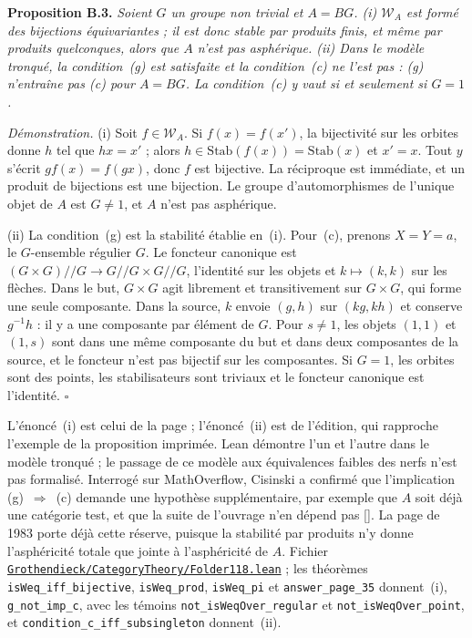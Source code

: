 \documentclass[11pt]{amsart}
\newcommand{\leanfile}[1]{\href{https://github.com/Commutator-IO/GrothendieckArchivesProofs/blob/main/Grothendieck/#1.lean}{\nolinkurl{Grothendieck/#1.lean}}}
\newcommand{\leanfile}[1]{\nolinkurl{Grothendieck/#1.lean}}
\newcommand{\moanswer}{\citealp{cisinski2026mo}}
\begin{document}
\medskip\noindent\textbf{Proposition B.3.} \emph{Soient $G$ un groupe non trivial et $A = BG$. (i) $\mathcal W_A$ est formé des bijections équivariantes ; il est donc stable par produits finis, et même par produits quelconques, alors que $A$ n'est pas asphérique. (ii) Dans le modèle tronqué, la condition~(g) est satisfaite et la condition~(c) ne l'est pas : (g) n'entraîne pas (c) pour $A = BG$. La condition~(c) y vaut si et seulement si $G = 1$.}

\medskip\noindent\emph{Démonstration.} (i) Soit $f \in \mathcal W_A$. Si $f(x) = f(x')$, la bijectivité sur les orbites donne $h$ tel que $hx = x'$ ; alors $h \in \mathrm{Stab}(f(x)) = \mathrm{Stab}(x)$ et $x' = x$. Tout $y$ s'écrit $g f(x) = f(gx)$, donc $f$ est bijective. La réciproque est immédiate, et un produit de bijections est une bijection. Le groupe d'automorphismes de l'unique objet de $A$ est $G \neq 1$, et $A$ n'est pas asphérique.

(ii) La condition~(g) est la stabilité établie en~(i). Pour~(c), prenons $X = Y = a$, le $G$-ensemble régulier $G$. Le foncteur canonique est $(G \times G)/\!/G \to G/\!/G \times G/\!/G$, l'identité sur les objets et $k \mapsto (k, k)$ sur les flèches. Dans le but, $G \times G$ agit librement et transitivement sur $G \times G$, qui forme une seule composante. Dans la source, $k$ envoie $(g, h)$ sur $(kg, kh)$ et conserve $g^{-1}h$ : il y a une composante par élément de $G$. Pour $s \neq 1$, les objets $(1, 1)$ et $(1, s)$ sont dans une même composante du but et dans deux composantes de la source, et le foncteur n'est pas bijectif sur les composantes. Si $G = 1$, les orbites sont des points, les stabilisateurs sont triviaux et le foncteur canonique est l'identité. $\square$

\medskip L'énoncé~(i) est celui de la page ; l'énoncé~(ii) est de l'édition, qui rapproche l'exemple de la proposition imprimée. Lean démontre l'un et l'autre dans le modèle tronqué ; le passage de ce modèle aux équivalences faibles des nerfs n'est pas formalisé. Interrogé sur MathOverflow, Cisinski a confirmé que l'implication (g)~$\Rightarrow$~(c) demande une hypothèse supplémentaire, par exemple que $A$ soit déjà une catégorie test, et que la suite de l'ouvrage n'en dépend pas [\moanswer]. La page de 1983 porte déjà cette réserve, puisque la stabilité par produits n'y donne l'asphéricité totale que jointe à l'asphéricité de $A$. Fichier \leanfile{CategoryTheory/Folder118} ; les théorèmes \texttt{isWeq\_iff\_bijective}, \texttt{isWeq\_prod}, \texttt{isWeq\_pi} et \texttt{answer\_page\_35} donnent~(i), \texttt{g\_not\_imp\_c}, avec les témoins \texttt{not\_isWeqOver\_regular} et \texttt{not\_isWeqOver\_point}, et \texttt{condition\_c\_iff\_subsingleton} donnent~(ii).
\end{document}

